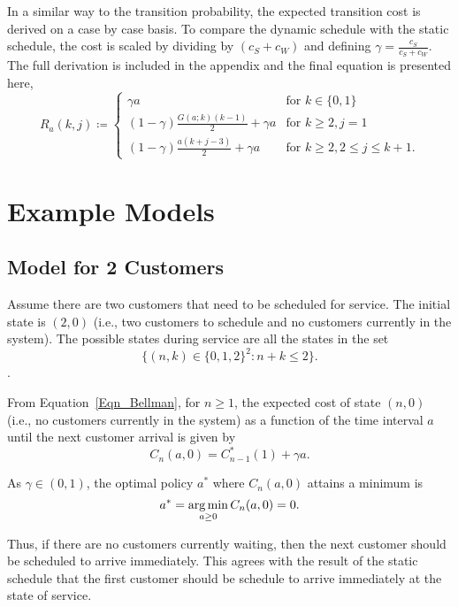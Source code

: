 In a similar way to the transition probability, the expected transition cost is derived on a case by case basis. To compare the dynamic schedule with the static schedule, the cost is scaled by dividing by $(c_{S} + c_{W})$ and defining $\gamma = \frac{c_{S}}{c_{S} + c_{W}}$. The full derivation is included in the appendix and the final equation is presented here,
\begin{equation}
	R_{a} (k, j) \coloneqq \begin{cases}
		\gamma a & \text{for $k \in \{ 0, 1 \}$} \\
		(1 - \gamma) \frac{G (a; k) (k - 1)}{2} + \gamma a & \text{for $k \geq 2, j = 1$} \\
		(1 - \gamma) \frac{a (k + j - 3)}{2} + \gamma a & \text{for $k \geq 2, 2 \leq j \leq k + 1$}.
	\end{cases}
\end{equation}

\section{Example Models}
\subsection{Model for 2 Customers}
Assume there are two customers that need to be scheduled for service. The initial state is $(2, 0)$ (i.e., two customers to schedule and no customers currently in the system). The possible states during service are all the states in the set
\begin{equation}
	\Big\{ (n, k) \in \{ 0, 1, 2 \}^{2} : n + k \leq 2 \Big\}.
\end{equation}.

From Equation~\ref{Eqn_Bellman}, for $n \geq 1$, the expected cost of state $(n, 0)$ (i.e., no customers currently in the system) as a function of the time interval $a$ until the next customer arrival is given by
\begin{equation}
	C_{n} (a, 0) = C_{n - 1}^{*} (1) + \gamma a.
\end{equation}

As $\gamma \in (0, 1)$, the optimal policy $a^{*}$ where $C_{n} (a, 0)$ attains a minimum is
\begin{equation}
	a^{*} = \operatorname*{arg\,min}_{a \geq 0} C_{n} (a, 0) = 0.
	\label{eqn:Dynamic_No_Waiting}
\end{equation}

Thus, if there are no customers currently waiting, then the next customer should be scheduled to arrive immediately. This agrees with the result of the static schedule that the first customer should be schedule to arrive immediately at the state of service.

